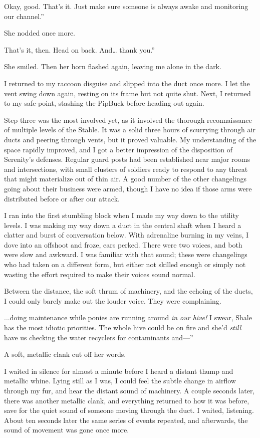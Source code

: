 \leavevmode{}Okay, good. That’s it. Just make sure someone is always awake and monitoring our channel.”

She nodded once more.

\leavevmode{}That’s it, then. Head on back. And… thank you.”

She smiled. Then her horn flashed again, leaving me alone in the dark.

I returned to my raccoon disguise and slipped into the duct once more. I let the vent swing down again, resting on its frame but not quite shut. Next, I returned to my safe-point, stashing the PipBuck before heading out again.

Step three was the most involved yet, as it involved the thorough reconnaissance of multiple levels of the Stable. It was a solid three hours of scurrying through air ducts and peering through vents, but it proved valuable. My understanding of the space rapidly improved, and I got a better impression of the disposition of Serenity’s defenses. Regular guard posts had been established near major rooms and intersections, with small clusters of soldiers ready to respond to any threat that might materialize out of thin air. A good number of the other changelings going about their business were armed, though I have no idea if those arms were distributed before or after our attack.

I ran into the first stumbling block when I made my way down to the utility levels. I was making my way down a duct in the central shaft when I heard a clatter and burst of conversation below. With adrenaline burning in my veins, I dove into an offshoot and froze, ears perked. There were two voices, and both were slow and awkward. I was familiar with that sound; these were changelings who had taken on a different form, but either not skilled enough or simply not wasting the effort required to make their voices sound normal.

Between the distance, the soft thrum of machinery, and the echoing of the ducts, I could only barely make out the louder voice. They were complaining.

\leavevmode{}...doing maintenance while ponies are running around \textit{in our hive!} I swear, Shale has the most idiotic priorities. The whole hive could be on fire and she’d \textit{still} have us checking the water recyclers for contaminants and—”

A soft, metallic clank cut off her words.

I waited in silence for almost a minute before I heard a distant thump and metallic whine. Lying still as I was, I could feel the subtle change in airflow through my fur, and hear the distant sound of machinery. A couple seconds later, there was another metallic clank, and everything returned to how it was before, save for the quiet sound of someone moving through the duct. I waited, listening. About ten seconds later the same series of events repeated, and afterwards, the sound of movement was gone once more.

